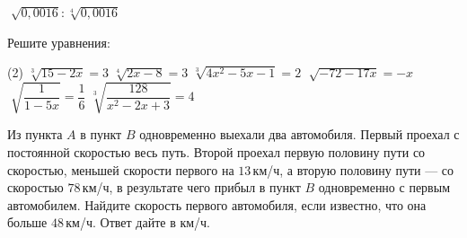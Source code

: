 \begin{class}[number=1]
\begin{listofex}
\begin{tasks}
			\task \( \sqrt[]{0,0016} : \sqrt[4]{0,0016} \)
		\end{tasks}
		\item Решите уравнения:
		\begin{tasks}(2)
			\task \( \sqrt[3]{15-2x} = 3 \)
			\task \( \sqrt[4]{2x-8}=3 \)
			\task \( \sqrt[3]{4x^2-5x-1}=2 \)
			\task \( \sqrt[]{-72-17x}=-x \)
			\task \( \sqrt[]{\dfrac{1}{1-5x}}=\dfrac{1}{6} \)
			\task \( \sqrt[3]{\dfrac{128}{x^2-2x+3}}=4 \)
		\end{tasks}
		\item Из пункта \(A\) в пункт \(B\) одновременно выехали два автомобиля. Первый проехал с постоянной скоростью весь путь. Второй проехал первую половину пути со скоростью, меньшей скорости первого на \(13\) км/ч, а вторую половину пути  --- со скоростью \(78\) км/ч, в результате чего прибыл в пункт \(B\) одновременно с первым автомобилем. Найдите скорость первого автомобиля, если известно, что она больше \(48\) км/ч. Ответ дайте в км/ч.
	\end{listofex}
\end{class}


